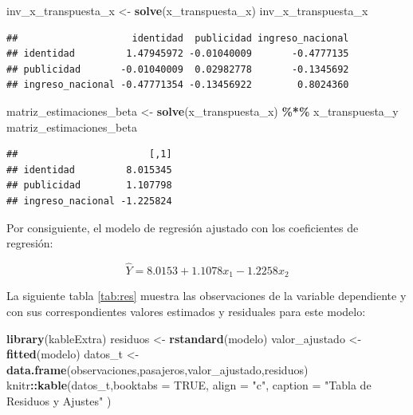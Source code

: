 \documentclass[
]{book}
\newenvironment{Shaded}{\begin{snugshade}}{\end{snugshade}}
\newcommand{\AttributeTok}[1]{\textcolor[rgb]{0.13,0.29,0.53}{#1}}
\newcommand{\ConstantTok}[1]{\textcolor[rgb]{0.56,0.35,0.01}{#1}}
\newcommand{\FunctionTok}[1]{\textcolor[rgb]{0.13,0.29,0.53}{\textbf{#1}}}
\newcommand{\NormalTok}[1]{#1}
\newcommand{\OtherTok}[1]{\textcolor[rgb]{0.56,0.35,0.01}{#1}}
\newcommand{\SpecialCharTok}[1]{\textcolor[rgb]{0.81,0.36,0.00}{\textbf{#1}}}
\newcommand{\StringTok}[1]{\textcolor[rgb]{0.31,0.60,0.02}{#1}}
\begin{document}
\begin{Shaded}
\begin{Highlighting}[]
\NormalTok{inv\_x\_transpuesta\_x }\OtherTok{\textless{}{-}} \FunctionTok{solve}\NormalTok{(x\_transpuesta\_x)}
\NormalTok{inv\_x\_transpuesta\_x}
\end{Highlighting}
\end{Shaded}

\begin{verbatim}
##                    identidad  publicidad ingreso_nacional
## identidad         1.47945972 -0.01040009       -0.4777135
## publicidad       -0.01040009  0.02982778       -0.1345692
## ingreso_nacional -0.47771354 -0.13456922        0.8024360
\end{verbatim}

\begin{Shaded}
\begin{Highlighting}[]
\NormalTok{matriz\_estimaciones\_beta }\OtherTok{\textless{}{-}} \FunctionTok{solve}\NormalTok{(x\_transpuesta\_x) }\SpecialCharTok{\%*\%}\NormalTok{ x\_transpuesta\_y}
\NormalTok{matriz\_estimaciones\_beta}
\end{Highlighting}
\end{Shaded}

\begin{verbatim}
##                       [,1]
## identidad         8.015345
## publicidad        1.107798
## ingreso_nacional -1.225824
\end{verbatim}

Por consiguiente, el modelo de regresión ajustado con los coeficientes de
regresión:

\[
\begin{equation}
\hat{Y} = 8.0153 + 1.1078x_{1} - 1.2258x_{2}
\end{equation}
\]

La siguiente tabla \ref{tab:res} muestra las observaciones de la variable dependiente y con sus correspondientes valores estimados y residuales para este modelo:

\begin{Shaded}
\begin{Highlighting}[]
\FunctionTok{library}\NormalTok{(kableExtra)}
\NormalTok{residuos }\OtherTok{\textless{}{-}} \FunctionTok{rstandard}\NormalTok{(modelo)}
\NormalTok{valor\_ajustado }\OtherTok{\textless{}{-}} \FunctionTok{fitted}\NormalTok{(modelo)}
\NormalTok{datos\_t }\OtherTok{\textless{}{-}} \FunctionTok{data.frame}\NormalTok{(observaciones,pasajeros,valor\_ajustado,residuos)}
\NormalTok{knitr}\SpecialCharTok{::}\FunctionTok{kable}\NormalTok{(datos\_t,}\AttributeTok{booktabs =} \ConstantTok{TRUE}\NormalTok{, }\AttributeTok{align =} \StringTok{"c"}\NormalTok{, }\AttributeTok{caption =} \StringTok{"Tabla de Residuos y Ajustes"}\NormalTok{ ) }
\end{Highlighting}
\end{Shaded}
\end{document}
